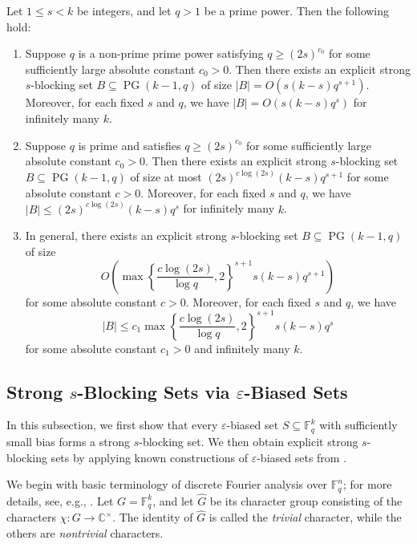 \documentclass[11pt]{article}
\newcommand{\eps}{\varepsilon}
\newcommand{\F}{\mathbb{F}}
\newcommand{\C}{\mathbb{C}}
\DeclareMathOperator{\PG}{PG}
\begin{document}
\begin{corollary}\label{cor:blocking}
Let $1\le s<k$ be integers, and let $q>1$ be a prime power.
Then the following hold:
\begin{enumerate}
\item\label{item:blocking1} Suppose $q$ is a non-prime prime power satisfying $q\ge (2s)^{c_0}$ for some sufficiently large absolute constant $c_0>0$. Then there exists an explicit strong $s$-blocking set $B\subseteq \PG(k-1,q)$ of size $|B|=O(s(k-s) q^{s+1})$. Moreover, for each fixed $s$ and $q$, we have $|B|=O(s(k-s) q^s)$ for infinitely many $k$.

\item\label{item:blocking2} Suppose $q$ is prime and satisfies $q\ge (2s)^{c_0}$ for some sufficiently large absolute constant $c_0>0$. Then there exists an explicit strong $s$-blocking set $B\subseteq \PG(k-1,q)$ of size at most $(2s)^{c\log(2s)} (k-s) q^{s+1}$ for some absolute constant $c>0$. Moreover, for each fixed $s$ and $q$, we have $|B|\le (2s)^{c\log(2s)} (k-s) q^s$ for infinitely many $k$.

\item\label{item:blocking3} In general, there exists an explicit strong $s$-blocking set $B\subseteq \PG(k-1,q)$ of size
\[
O\!\left(\max\left\{\frac{c\log (2s)}{\log q},2\right\}^{s+1} s(k-s) q^{s+1}\right)
\]
for some absolute constant $c>0$. Moreover, for each fixed $s$ and $q$, we have
\[
|B|\leq c_1 \max\left\{\frac{c\log (2s)}{\log q},2\right\}^{s+1} s(k-s) q^s
\]
for some absolute constant $c_1>0$ and infinitely many $k$.
\end{enumerate}
\end{corollary}

\subsection{Strong $s$-Blocking Sets via $\eps$-Biased Sets}

In this subsection, we first show that every $\eps$-biased set $S\subseteq \mathbb{F}_q^k$ with sufficiently small bias forms a strong $s$-blocking set. We then obtain explicit strong $s$-blocking sets by applying known constructions of $\eps$-biased sets from \cite{Ta17,JM21}.

We begin with basic terminology of discrete Fourier analysis over $\mathbb{F}_q^n$; for more details, see, e.g., \cite{TV06,O14}. Let $G=\F_q^k$, and let $\widehat{G}$ be its character group consisting of the characters $\chi: G\to\C^\times$. The identity of $\widehat{G}$ is called the \emph{trivial} character, while the others are \emph{nontrivial} characters.
\end{document}
